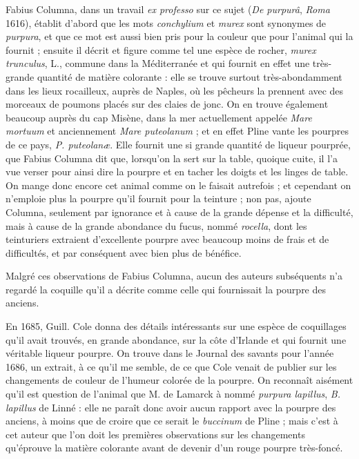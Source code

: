 \documentclass[a4paper, 11pt, oneside, polutonikogreek, french]{article}
\begin{document}
Fabius Columna, dans un travail \emph{ex professo} sur ce sujet (\emph{De purpurâ}, \emph{Roma} 1616), établit d'abord que les mots \emph{conchylium} et \emph{murex} sont synonymes de \emph{purpura}, et que ce mot est aussi bien pris pour la couleur que pour l'animal qui la fournit ; ensuite il décrit et figure comme tel une espèce de rocher, \emph{murex trunculus}, L., commune dans la Méditerranée et qui fournit en effet une très-grande quantité de matière colorante : elle se trouve surtout très-abondamment dans les lieux rocailleux, auprès de Naples, où les pêcheurs la prennent avec des morceaux de poumons placés sur des claies de jonc. On en trouve également beaucoup auprès du cap Misène, dans la mer actuellement appelée \emph{Mare mortuum} et anciennement \emph{Mare puteolanum} ; et en effet Pline vante les pourpres de ce pays, \emph{P. puteolanæ}. Elle fournit une si grande quantité de liqueur pourprée, que Fabius Columna dit que, lorsqu'on la sert sur la table, quoique cuite, il l'a vue verser pour ainsi dire la pourpre et en tacher les doigts et les linges de table. On mange donc encore cet animal comme on le faisait autrefois ; et cependant on n'emploie plus la pourpre qu'il fournit pour la teinture ; non pas, ajoute Columna, seulement par ignorance et à cause de la grande dépense et la difficulté, mais à cause de la grande abondance du fucus, nommé \emph{rocella}, dont les teinturiers extraient d'excellente pourpre avec beaucoup moins de frais et de difficultés, et par conséquent avec bien plus de bénéfice.

Malgré ces observations de Fabius Columna, aucun des auteurs subséquents n'a regardé la coquille qu'il a décrite comme celle qui fournissait la pourpre des anciens.

En 1685, Guill. Cole donna des détails intéressants sur une espèce de coquillages qu'il avait trouvés, en grande abondance, sur la côte d'Irlande et qui fournit une véritable liqueur pourpre. On trouve dans le Journal des savants pour l'année 1686, un extrait, à ce qu'il me semble, de ce que Cole venait de publier sur les changements de couleur de l'humeur colorée de la pourpre. On reconnaît aisément qu'il est question de l'animal que M. de Lamarck à nommé \emph{purpura lapillus}, \emph{B. lapillus} de Linné : elle ne paraît donc avoir aucun rapport avec la pourpre des anciens, à moins que de croire que ce serait le \emph{buccinum} de Pline ; mais c'est à cet auteur que l'on doit les premières observations sur les changements qu'éprouve la matière colorante avant de devenir d'un rouge pourpre très-foncé.
\end{document}

